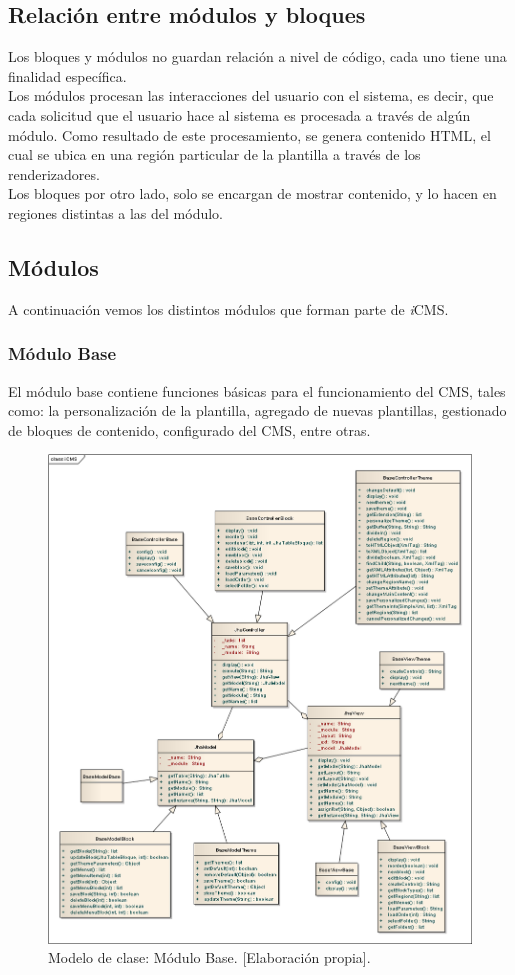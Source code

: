 \subsection{Relaci\'on entre m\'odulos y bloques}
Los bloques y m\'odulos no guardan relaci\'on a nivel de c\'odigo, cada uno tiene una finalidad espec\'ifica.\\
Los m\'odulos procesan las interacciones del usuario con el sistema, es decir, que cada solicitud que el usuario hace al sistema es procesada a trav\'es de alg\'un m\'odulo. Como resultado de este procesamiento, se genera contenido HTML, el cual se ubica en una regi\'on particular de la plantilla a trav\'es de los renderizadores.\\
Los bloques por otro lado, solo se encargan de mostrar contenido, y lo hacen en regiones distintas a las del m\'odulo.

\subsection{M\'odulos}
A continuaci\'on vemos los distintos m\'odulos que forman parte de \textit{i}CMS.

\subsubsection{M\'odulo Base}
El m\'odulo base contiene funciones b\'asicas para el funcionamiento del CMS, tales como: la personalizaci\'on de la plantilla, agregado de nuevas plantillas, gestionado de bloques de contenido, configurado del CMS, entre otras.

\begin{figure}[h]
\centering
\includegraphics[scale=.35, keepaspectratio=true]{imagenes/13_imagen.png}
\caption{Modelo de clase: M\'odulo Base. [Elaboraci\'on propia].}
\end{figure}


